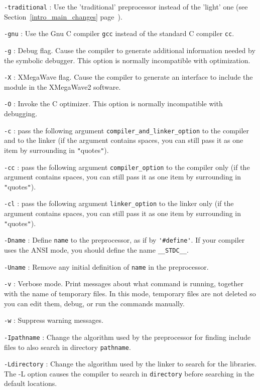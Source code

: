 \Next
\Options
\verb+-traditional+ : Use the 'traditional' preprocessor instead of the 'light' one
(see Section~\ref{intro_main_changes} page~\pageref{intro_main_changes}).

\verb+-gnu+ : Use the Gnu C compiler \verb+gcc+ instead of the standard C compiler \verb+cc+.

\verb+-g+ : Debug flag. Cause the compiler to generate additional information
needed by the symbolic debugger.  This option is normally incompatible with optimization.

\verb+-X+ : XMegaWave flag. Cause the compiler to generate an interface to include the module in the XMegaWave2 software.

\verb+-O+ : Invoke the C optimizer. This option is normally incompatible with debugging.

\verb+-c+ : pass the following argument \verb+compiler_and_linker_option+ to the compiler and to the linker
(if the argument contains spaces, you can still pass it as one item by surrounding in \verb+"+quotes\verb+"+).

\verb+-cc+ : pass the following argument \verb+compiler_option+ to the compiler only
(if the argument contains spaces, you can still pass it as one item by surrounding in \verb+"+quotes\verb+"+).

\verb+-cl+ : pass the following argument \verb+linker_option+ to the linker only
(if the argument contains spaces, you can still pass it as one item by surrounding in \verb+"+quotes\verb+"+).

\verb+-Dname+ : Define \verb+name+ to the preprocessor, as if by \verb+'#define'+. 
If your compiler uses the ANSI mode, you should define the name  \verb+__STDC__+.

\verb+-Uname+ : Remove any initial definition of \verb+name+ in the preprocessor. 

\verb+-v+ : Verbose mode. Print messages about what command is running, together with the name of temporary files. In this mode, temporary files are not deleted so you can edit them, debug, or run the commands manually.

\verb+-w+ : Suppress warning messages.

\verb+-Ipathname+ : Change the algorithm used by the preprocessor for finding include files to also search in directory \verb+pathname+.

\verb+-Ldirectory+ :  Change the algorithm used by the linker to search for
the libraries.  The -L option causes the compiler to search in \verb+directory+ before searching in the default locations.

